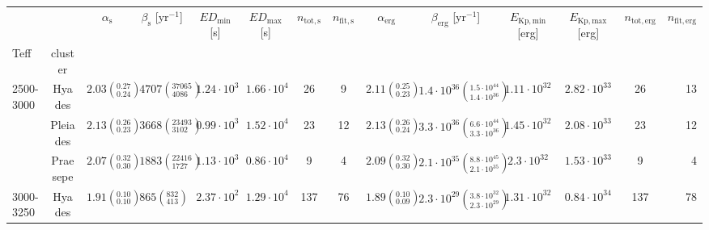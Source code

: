 \begin{tabular}{lccccccccccccr}
\hline
          &         &                $\alpha_\mathrm{s}$ &      $\beta_\mathrm{s}$ [yr$^{-1}$] & $ED_\mathrm{min}$ [s] & $ED_\mathrm{max}$ [s] &  $n_\mathrm{tot,s}$ &  $n_\mathrm{fit,s}$ &              $\alpha_\mathrm{erg}$ &                                          $\beta_\mathrm{erg}$ [yr$^{-1}$] & $E_\mathrm{Kp,min}$ [erg] & $E_\mathrm{Kp,max}$ [erg] &  $n_\mathrm{tot,erg}$ &  $n_\mathrm{fit,erg}$ \\
Teff & cluster &                                    &                                     &                       &                       &                     &                     &                                    &                                                                           &                           &                           &                       &                       \\
\hline
2500-3000 & Hyades &  $2.03\left(^{0.27}_{0.24}\right)$ &  $4707\left(^{37065}_{4086}\right)$ &    $1.24\cdot 10^{3}$ &    $1.66\cdot 10^{4}$ &                  26 &                   9 &  $2.11\left(^{0.25}_{0.23}\right)$ &  $1.4 \cdot 10^{36}\left(^{1.5 \cdot 10^{44}}_{1.4 \cdot 10^{36}}\right)$ &       $1.11\cdot 10^{32}$ &       $2.82\cdot 10^{33}$ &                    26 &                    13 \\
          & Pleiades &  $2.13\left(^{0.26}_{0.23}\right)$ &  $3668\left(^{23493}_{3102}\right)$ &    $0.99\cdot 10^{3}$ &    $1.52\cdot 10^{4}$ &                  23 &                  12 &  $2.13\left(^{0.26}_{0.24}\right)$ &  $3.3 \cdot 10^{36}\left(^{6.6 \cdot 10^{44}}_{3.3 \cdot 10^{36}}\right)$ &       $1.45\cdot 10^{32}$ &       $2.08\cdot 10^{33}$ &                    23 &                    12 \\
          & Praesepe &  $2.07\left(^{0.32}_{0.30}\right)$ &  $1883\left(^{22416}_{1727}\right)$ &    $1.13\cdot 10^{3}$ &    $0.86\cdot 10^{4}$ &                   9 &                   4 &  $2.09\left(^{0.32}_{0.30}\right)$ &  $2.1 \cdot 10^{35}\left(^{8.8 \cdot 10^{45}}_{2.1 \cdot 10^{35}}\right)$ &        $2.3\cdot 10^{32}$ &       $1.53\cdot 10^{33}$ &                     9 &                     4 \\
3000-3250 & Hyades &  $1.91\left(^{0.10}_{0.10}\right)$ &      $865\left(^{832}_{413}\right)$ &    $2.37\cdot 10^{2}$ &    $1.29\cdot 10^{4}$ &                 137 &                  76 &  $1.89\left(^{0.10}_{0.09}\right)$ &  $2.3 \cdot 10^{29}\left(^{3.8 \cdot 10^{32}}_{2.3 \cdot 10^{29}}\right)$ &       $1.31\cdot 10^{32}$ &       $0.84\cdot 10^{34}$ &                   137 &                    78 \\

\end{tabular}
